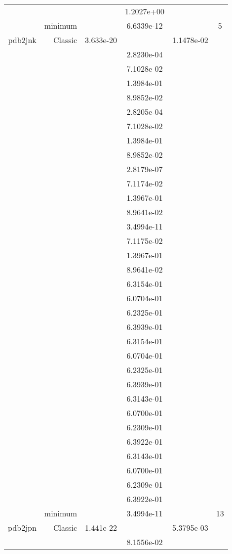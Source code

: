 \begin{xltabular}{\textwidth}{r|rS[table-format=1.3e+2]S[table-format=1.4e+2]S[table-format=1.4e+2]S[table-format=-1.5]}
&  &  & 1.2027e+00 & & \\
& minimum &  & 6.6339e-12 & & 5 \\  \addlinespace
pdb2jnk & Classic & 3.633e-20 &  & 1.1478e-02 & \\
&  &  & 2.8230e-04 & & \\
&  &  & 7.1028e-02 & & \\
&  &  & 1.3984e-01 & & \\
&  &  & 8.9852e-02 & & \\
&  &  & 2.8205e-04 & & \\
&  &  & 7.1028e-02 & & \\
&  &  & 1.3984e-01 & & \\
&  &  & 8.9852e-02 & & \\
&  &  & 2.8179e-07 & & \\
&  &  & 7.1174e-02 & & \\
&  &  & 1.3967e-01 & & \\
&  &  & 8.9641e-02 & & \\
&  &  & 3.4994e-11 & & \\
&  &  & 7.1175e-02 & & \\
&  &  & 1.3967e-01 & & \\
&  &  & 8.9641e-02 & & \\
&  &  & 6.3154e-01 & & \\
&  &  & 6.0704e-01 & & \\
&  &  & 6.2325e-01 & & \\
&  &  & 6.3939e-01 & & \\
&  &  & 6.3154e-01 & & \\
&  &  & 6.0704e-01 & & \\
&  &  & 6.2325e-01 & & \\
&  &  & 6.3939e-01 & & \\
&  &  & 6.3143e-01 & & \\
&  &  & 6.0700e-01 & & \\
&  &  & 6.2309e-01 & & \\
&  &  & 6.3922e-01 & & \\
&  &  & 6.3143e-01 & & \\
&  &  & 6.0700e-01 & & \\
&  &  & 6.2309e-01 & & \\
&  &  & 6.3922e-01 & & \\
& minimum &  & 3.4994e-11 & & 13 \\  \addlinespace
pdb2jpn & Classic & 1.441e-22 &  & 5.3795e-03 & \\
&  &  & 8.1556e-02 & & \\

\end{xltabular}
